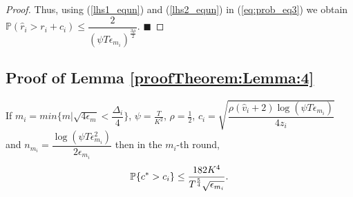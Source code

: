 \begin{proof}
Thus, using (\ref{lhs1_equn}) and (\ref{lhs2_equn}) in (\ref{eq:prob_eq3}) we obtain $\mathbb{P}(\hat{r}_{i}> r_{i} + c_{i})\le \dfrac{2}{(\psi  T\epsilon_{m_{i}})^{\frac{3\rho}{2}}}$.
\hfill $\blacksquare$	
\end{proof}


\subsection{Proof of Lemma \ref{proofTheorem:Lemma:4}}
\label{App:Lemma:4}
\begin{customlem}{4}
If $m_i = min\lbrace m|\sqrt{4\epsilon_{m} } < \dfrac{\Delta_i}{4} \rbrace $, $\psi=\frac{T}{ K^2}$, $\rho=\frac{1}{2}$,  $c_{i} =\sqrt{\dfrac{\rho(\hat{v}_i + 2)\log (\psi T\epsilon_{m_{i}})}{4 z_{i}}}$ and $n_{m_i}=\dfrac{\log{(\psi T\epsilon_{m_{i}}^{2})}}{2\epsilon_{m_{i}}}$ then in the $m_i$-th round, 
\begin{align*}
\mathbb{P}\lbrace c^{*} > c_i \rbrace  \leq \dfrac{182 K^4}{T^{\frac{5}{4}}\sqrt{\epsilon_{m_i}}}.
\end{align*}
\end{customlem}


